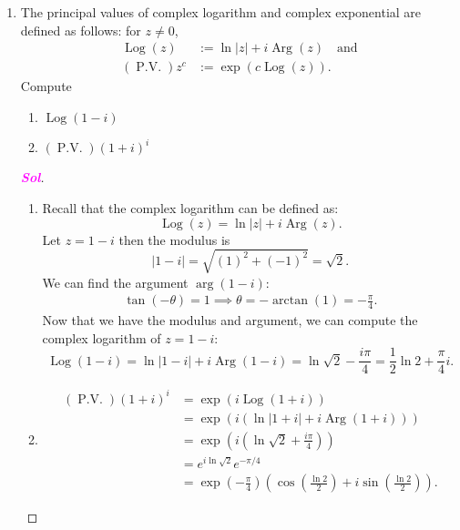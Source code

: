 \documentclass{article}
\theoremstyle{definition}
\newcommand{\Log}{\operatorname{Log}}
\newcommand{\Arg}{\operatorname{Arg}}
\newcommand{\pv}{\operatorname{P.V.}}
\newcommand{\of}[1]{\left( #1 \right)}
\newcommand{\abs}[1]{\left\lvert #1 \right\rvert}
\newcommand{\sol}{\textcolor{magenta}{\bf Sol}}
\begin{document}
\begin{enumerate}
		\item The principal values of complex logarithm and complex exponential are defined as follows: for $z\neq 0$,
		\begin{align*}
		\Log\of{z} &:=\ln\abs{z}+i\Arg\of{z}\quad\text{and}\\
		\of{\pv}z^c &:=\exp\of{c\Log\of{z}}.
		\end{align*} Compute \begin{enumerate}
			\item $\Log\of{1-i}$ 
			\item $\of{\pv}\of{1+i}^i$
		\end{enumerate}
		\begin{proof}[\sol]
			\begin{enumerate}
				\item Recall that the complex logarithm can be defined as:
				\[\Log(z) = \ln|z| + i\Arg(z).
				\]
				Let $z = 1-i$ then the modulus is
				\[|1-i| = \sqrt{(1)^2 + (-1)^2} = \sqrt{2}.\]
				We can find the argument $\arg(1-i)$: \begin{align*}
				\tan(-\theta)=1\implies\theta=-\arctan\of{1}=-\frac{\pi}{4}.
				\end{align*}
				Now that we have the modulus and argument, we can compute the complex logarithm of $z = 1 - i$:
				\[
				\Log(1-i) = \ln|1-i| + i\Arg(1-i) = \ln\sqrt{2} - \frac{i\pi}{4}=\frac{1}{2}\ln 2+\frac{\pi}{4}i.
				\]
				\vspace{4pt}
				\item \begin{align*}
				\of{\pv}\of{1+i}^i &=\exp\of{i\Log\of{1+i}}\\
				&=\exp\of{i\of{\ln\abs{1+i}+i\Arg\of{1+i}}}\\
				&=\exp\of{i\of{\ln\sqrt{2}+\frac{i\pi}{4}}}\\
				&=e^{i\ln\sqrt{2}}e^{-\pi/4}\\
				&=\exp\of{-\frac{\pi}{4}}\of{\cos\of{\frac{\ln 2}{2}}+i\sin\of{\frac{\ln 2}{2}}}.
				\end{align*}
			\end{enumerate}
		\end{proof}
		

\end{enumerate}
\end{document}
